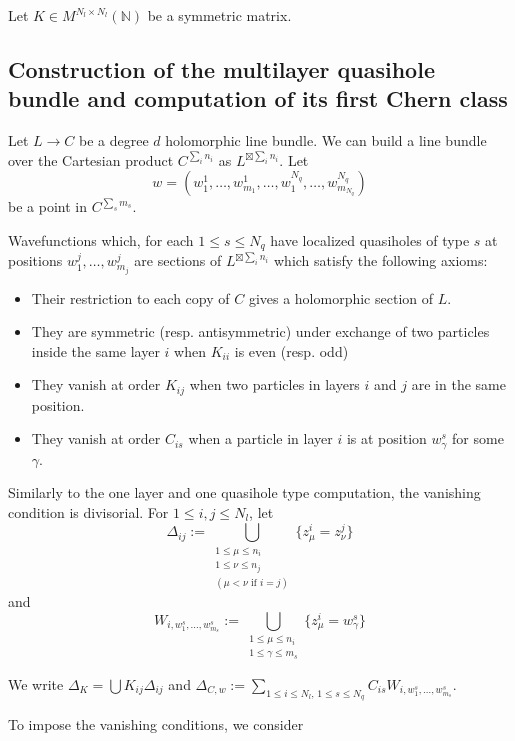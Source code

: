 \documentclass{article}
\theoremstyle{definition}
\renewcommand{\leq}{\leqslant}
\begin{document}
Let $K\in M^{N_l\times N_l}(\mathbb{N})$ be a symmetric matrix.


\subsection{Construction of the multilayer quasihole bundle and computation of its first Chern class}
\label{subsec:constructionfirstchernclassmultilayer}

Let $L\rightarrow C$ be a degree $d$ holomorphic line bundle. We can build a line bundle over the Cartesian product $C^{\sum_i n_i}$ as $L^{\boxtimes \sum_i n_i}$. 
Let $$w=(w_1^1,\dots,w_{m_1}^1,\dots, w_1^{N_q},\dots,w_{m_{N_q}}^{N_q} )$$ be a point in $C^{\sum_s m_s}$.

Wavefunctions which, for each $1\leq s \leq {N_q}$ have localized quasiholes of type $s$ at positions $w_1^j,\dots,w_{m_j}^j$ are sections of $L^{\boxtimes \sum_i n_i}$ which satisfy the following axioms:

\begin{itemize}
    \item Their restriction to each copy of $C$ gives a holomorphic section of $L$.
    \item They are symmetric (resp. antisymmetric) under exchange of two particles inside the same layer $i$ when $K_{ii}$ is even (resp. odd)
    \item They vanish at order $K_{ij}$ when two particles in layers $i$ and $j$ are in the same position.
    \item  They vanish at order $C_{is}$ when a particle in layer $i$ is at position $w_\gamma^s$ for some $\gamma$.
\end{itemize}

Similarly to the one layer and one quasihole type computation, the vanishing condition is divisorial. 
For $1 \leq i,j\leq {N_l}$, let
$$\Delta_{ij} := \bigcup_{\substack{1 \le \mu \le n_i \\ 1 \le \nu \le n_j \\ (\mu<\nu \text{ if } i=j)}} \{ z^i_\mu = z^j_\nu \}$$ and 
$$ W_{i,w^s_1,\dots,w^s_{m_s}}:=\bigcup_{\substack{1 \le \mu \le n_i \\ 1 \le \gamma \le m_s}} \{ z^i_\mu = w^s_\gamma \}$$

We write $\Delta_K=\bigcup K_{ij}\Delta_{ij}$ and $\Delta_{C,w} :=\sum_{1\leq i\leq {N_l},\, 1\leq s \leq N_{q}} C_{is} W_{i, w^s_1,\dots,w^s_{m_s} }$.



To impose the vanishing conditions, we consider 
\end{document}
